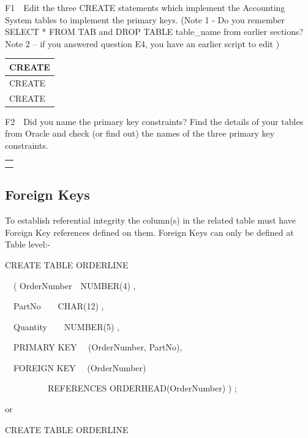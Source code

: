F1\ \ Edit the three CREATE statements which implement the Accounting System tables to implement the primary keys.  (Note 1 - Do you remember SELECT * FROM TAB and DROP TABLE table\_name from earlier sections? Note 2 -- if you answered question E4, you have an earlier script to edit )

\begin{flushleft}
\tablefirsthead{}
\tablehead{}
\tabletail{}
\tablelasttail{}
\begin{supertabular}{|m{14.663cm}|}
\hline
CREATE

\\\hline
CREATE

\\\hline
CREATE

\\\hline
\end{supertabular}
\end{flushleft}
F2\ \ Did you name the primary key constraints? Find the details of your tables from Oracle and check (or find out) the names of the three primary key constraints.

\begin{flushleft}
\tablefirsthead{}
\tablehead{}
\tabletail{}
\tablelasttail{}
\begin{supertabular}{|m{14.663cm}|}
\hline
\\\hline
\\\hline
\\\hline
\end{supertabular}
\end{flushleft}
\subsection{Foreign Keys}
To establish referential integrity the column(s) in the related table must have Foreign Key references defined on them.  Foreign Keys can only be defined at Table level:-

CREATE TABLE ORDERLINE

\ \ ( OrderNumber\ \ NUMBER(4) ,

\ \   PartNo\ \ \ \ CHAR(12) ,

\ \   Quantity\ \ \ \ NUMBER(5) ,

\ \   PRIMARY KEY \ \ (OrderNumber, PartNo),

\ \   FOREIGN KEY \ \ (OrderNumber) 

\ \ \ \ \ \ \ \ \ \ REFERENCES ORDERHEAD(OrderNumber) ) ;

or

CREATE TABLE ORDERLINE

